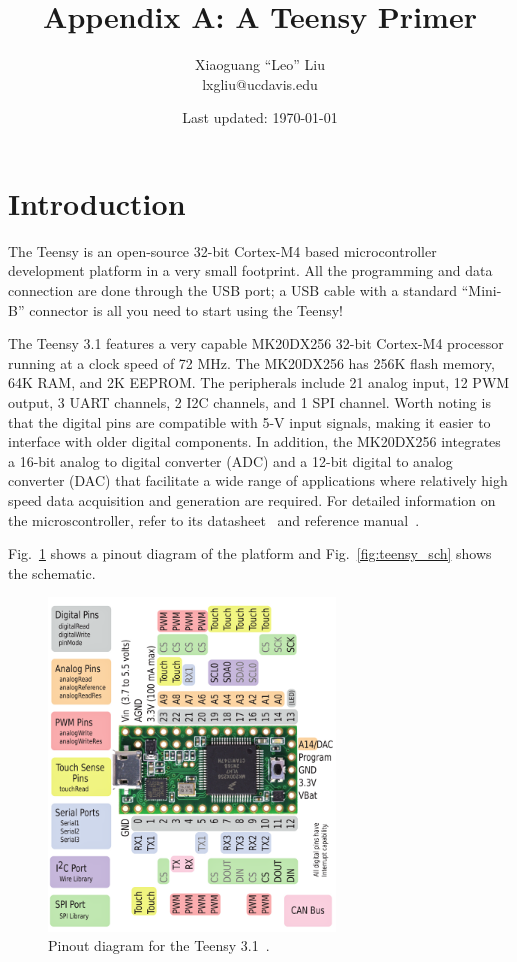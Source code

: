 \documentclass[letterpaper, 11pt]{article}
\begin{document}
\title{Appendix A: A Teensy Primer}
\author{Xiaoguang ``Leo'' Liu\\lxgliu@ucdavis.edu}
\date{Last updated: \today}

\maketitle

\section{Introduction}
The Teensy is an open-source 32-bit Cortex-M4 based microcontroller development platform in a very small footprint. All the programming and data connection are done through the USB port; a USB cable with a standard ``Mini-B'' connector is all you need to start using the Teensy!

The Teensy 3.1 features a very capable MK20DX256 32-bit Cortex-M4 processor running at a clock speed of 72 MHz. The MK20DX256 has 256K flash memory, 64K RAM, and 2K EEPROM. The peripherals include 21 analog input, 12 PWM output, 3 UART channels, 2 I2C channels, and 1 SPI channel. Worth noting is that the digital pins are compatible with 5-V input signals, making it easier to interface with older digital components. In addition, the MK20DX256 integrates a 16-bit analog to digital converter (ADC) and a 12-bit digital to analog converter (DAC) that facilitate a wide range of applications where relatively high speed data acquisition and generation are required. For detailed information on the microscontroller, refer to its datasheet~\cite{bib:mk20_ds} and reference manual~\cite{bib:mk20_rm}. 

 Fig.~\ref{fig:teensy_pinout} shows a pinout diagram of the platform and Fig.~\ref{fig:teensy_sch} shows the schematic.  

\begin{figure}[ht]
	\centering
	\includegraphics[width=3in]{teensy_pinout.png}
	\caption{Pinout diagram for the Teensy 3.1~\cite{bib:teensy_pinout}.}
	\label{fig:teensy_pinout}
\end{figure}
\end{document}
